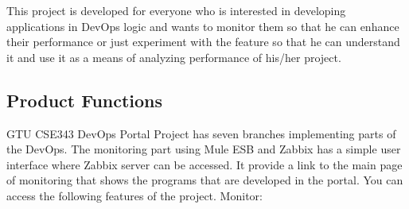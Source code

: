 \documentclass{article}
\begin{document}
     This project  is developed for everyone who is interested in developing applications in DevOps logic and wants to monitor them so that he can enhance their performance or just experiment with the feature so that he can understand it and use it as a means of analyzing performance of his/her project.

\subsection{Product Functions}

	GTU CSE343 DevOps Portal Project has seven branches implementing  parts of the DevOps. The  monitoring part using Mule ESB and Zabbix has a simple user interface where Zabbix server can be accessed. It provide a link to the main page of monitoring that shows the programs that are developed in the portal. You can access the following features of the project.
\flushleft
Monitor:
\end{document}
